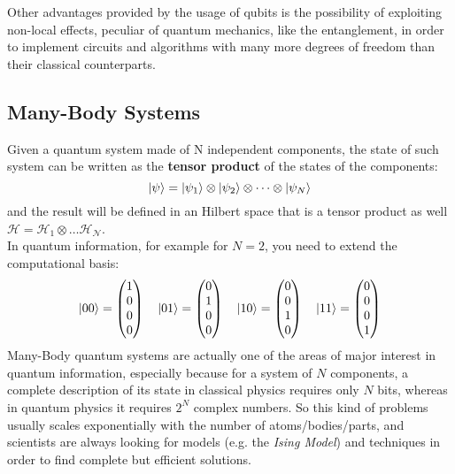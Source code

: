 Other advantages provided by the usage of qubits is the possibility of exploiting non-local effects, peculiar of quantum mechanics, like the entanglement, in order to implement circuits and algorithms with many more degrees of freedom than their classical counterparts.\\

\subsection{Many-Body Systems}
Given a quantum system made of N independent components, the state of such system can be written as the \textbf{tensor product} of the states of the components:
\[ \ket{\psi} = \ket{\psi_1}\otimes\ket{\psi_2}\otimes\dots\otimes\ket{\psi_N} \]
and the result will be defined in an Hilbert space that is a tensor product as well $\mathcal{H} = \mathcal{H_1}\otimes\dots\mathcal{H_N}$.\\
In quantum information, for example for $N=2$, you need to extend the computational basis:
\[ \ket{00} = \begin{pmatrix}1\\0\\0\\0\end{pmatrix} \quad \ket{01} = \begin{pmatrix}0\\1\\0\\0\end{pmatrix} \quad \ket{10} = \begin{pmatrix}0\\0\\1\\0\end{pmatrix} \quad \ket{11} = \begin{pmatrix}0\\0\\0\\1\end{pmatrix} \]
Many-Body quantum systems are actually one of the areas of major interest in quantum information, especially because for a system of $N$ components, a complete description of its state in classical physics requires only $N$ bits, whereas in quantum physics it requires $2^N$ complex numbers. So this kind of problems usually scales exponentially with the number of atoms/bodies/parts, and scientists are always looking for models (e.g. the \textit{Ising Model}) and techniques in order to find complete but efficient solutions.\\

